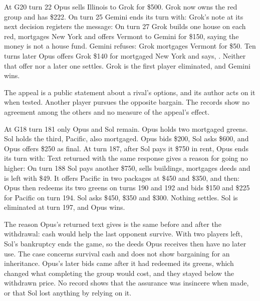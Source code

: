 At G20 turn 22 Opus sells Illinois to Grok for \$500. Grok now owns the red group and has \$222. On turn 25 Gemini ends its turn with:
Grok's note at its next decision registers the message:
On turn 27 Grok builds one house on each red, mortgages New York and offers Vermont to Gemini for \$150, saying the money is not a house fund. Gemini refuses:
Grok mortgages Vermont for \$50. Ten turns later Opus offers Grok \$140 for mortgaged New York and says, . Neither that offer nor a later one settles. Grok is the first player eliminated, and Gemini wins.

The appeal is a public statement about a rival's options, and its author acts on it when tested. Another player pursues the opposite bargain. The records show no agreement among the others and no measure of the appeal's effect.

At G18 turn 181 only Opus and Sol remain. Opus holds two mortgaged greens. Sol holds the third, Pacific, also mortgaged. Opus bids \$200, Sol asks \$600, and Opus offers \$250 as final. At turn 187, after Sol pays it \$750 in rent, Opus ends its turn with:
Text returned with the same response gives a reason for going no higher:
On turn 188 Sol pays another \$750, sells buildings, mortgages deeds and is left with \$49. It offers Pacific in two packages at \$450 and \$350, and then:
Opus then redeems its two greens on turns 190 and 192 and bids \$150 and \$225 for Pacific on turn 194. Sol asks \$450, \$350 and \$300. Nothing settles. Sol is eliminated at turn 197, and Opus wins.

The reason Opus's returned text gives is the same before and after the withdrawal: cash would help the last opponent survive. With two players left, Sol's bankruptcy ends the game, so the deeds Opus receives then have no later use. The case concerns survival cash and does not show bargaining for an inheritance. Opus's later bids came after it had redeemed its greens, which changed what completing the group would cost, and they stayed below the withdrawn price. No record shows that the assurance was insincere when made, or that Sol lost anything by relying on it.


